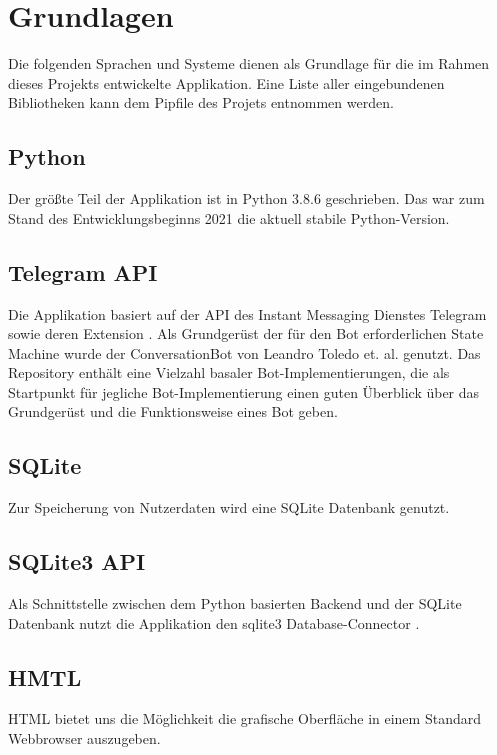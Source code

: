 \chapter{Grundlagen}

Die folgenden Sprachen und Systeme dienen als Grundlage für die im Rahmen dieses Projekts entwickelte Applikation. Eine Liste aller eingebundenen Bibliotheken kann dem Pipfile des Projets entnommen werden. 

\section{Python}
Der größte Teil der Applikation ist in Python 3.8.6 \cite{python3.8.6} geschrieben. Das war zum Stand des Entwicklungsbeginns 2021 die aktuell stabile Python-Version.

\section{Telegram API}
Die Applikation basiert auf der API des Instant Messaging Dienstes Telegram \cite{telegramAPI} sowie deren Extension \cite{telegramAPIext}.
Als Grundgerüst der für den Bot erforderlichen State Machine wurde der ConversationBot von Leandro Toledo et. al. genutzt. \cite{conversationBot} Das Repository enthält eine Vielzahl basaler Bot-Implementierungen, die als Startpunkt für jegliche Bot-Implementierung einen guten Überblick über das Grundgerüst und die Funktionsweise eines Bot geben.

\section{SQLite}
Zur Speicherung von Nutzerdaten wird eine SQLite Datenbank \cite{sqlite} genutzt.

\section{SQLite3 API}
Als Schnittstelle zwischen dem Python basierten Backend und der SQLite Datenbank nutzt die Applikation den sqlite3 Database-Connector \cite{sqlite3API}.


\section{HMTL}
HTML bietet uns die Möglichkeit die grafische Oberfläche in einem Standard Webbrowser auszugeben. \cite{HTML}


